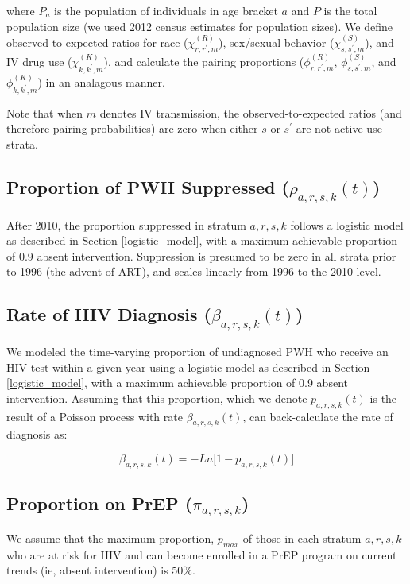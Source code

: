 \documentclass{article}
\begin{document}
where $P_a$ is the population of individuals in age bracket $a$ and $P$ is the total population size (we used 2012 census estimates for population sizes). We define observed-to-expected ratios for race \big($\chi^{(R)}_{r,r^\prime,m}$\big), sex/sexual behavior \big($\chi^{(S)}_{s,s^\prime,m}$\big), and IV drug use \big($\chi^{(K)}_{k,k^\prime,m}$\big), and calculate the pairing proportions ($\phi^{(R)}_{r,r^\prime,m}$, $\phi^{(S)}_{s,s^\prime,m}$, and $\phi^{(K)}_{k,k^\prime,m}$) in an analagous manner.

Note that when $m$ denotes IV transmission, the observed-to-expected ratios (and therefore pairing probabilities) are zero when either $s$ or $s^\prime$ are not active use strata.


\subsection{Proportion of PWH Suppressed \big($\rho_{a,r,s,k}(t)$\big)}\label{suppression}

After 2010, the proportion suppressed in stratum $a,r,s,k$ follows a logistic model as described in Section \ref{logistic_model}, with a maximum achievable proportion of 0.9 absent intervention. Suppression is presumed to be zero in all strata prior to 1996 (the advent of ART), and scales linearly from 1996 to the 2010-level.

\subsection{Rate of HIV Diagnosis \big($\beta_{a,r,s,k}(t)$\big)}\label{testing}

We modeled the time-varying proportion of undiagnosed PWH who receive an HIV test within a given year using a logistic model as described in Section \ref{logistic_model}, with a maximum achievable proportion of 0.9 absent intervention. Assuming that this proportion, which we denote $p_{a,r,s,k}(t)$ is the result of a Poisson process with rate $\beta_{a,r,s,k}(t)$, can back-calculate the rate of diagnosis as:

\begin{equation}
\beta_{a,r,s,k}(t) = -Ln\big[1-p_{a,r,s,k}(t)\big]
\end{equation}


\subsection{Proportion on PrEP \big($\pi_{a,r,s,k}$\big)}\label{prep}
We assume that the maximum proportion, $p_{max}$ of those in each stratum $a,r,s,k$ who are at risk for HIV and can become enrolled in a PrEP program on current trends (ie, absent intervention) is 50\%.
\end{document}
